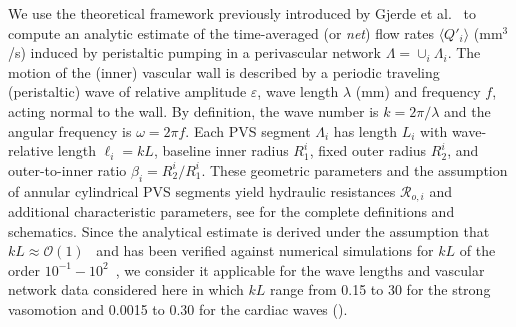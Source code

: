 We use the theoretical framework previously introduced by Gjerde et al.~\cite{gjerde2023directional} to compute an analytic estimate of the time-averaged (or \emph{net}) flow rates $\langle Q'_i \rangle$ (mm$^3$/s) induced by peristaltic pumping in a perivascular network $\Lambda = \cup_i \Lambda_i$. The motion of the (inner) vascular wall is described by a periodic traveling (peristaltic) wave of relative amplitude $\varepsilon$, wave length $\lambda$ (mm) and frequency $f$, acting normal to the wall. By definition, the wave number is $k = 2 \pi/\lambda$ and the angular frequency is $\omega = 2 \pi f$. Each PVS segment $\Lambda_i$ has length $L_i$ with wave-relative length $\ell_i = k L$, baseline inner radius $R_1^i$, fixed outer radius $R_2^i$, and outer-to-inner ratio $\beta_i = R_2^i/R_1^i$. These geometric parameters and the assumption of annular cylindrical PVS segments yield hydraulic resistances $\mathcal{R}_{o, i}$ and additional characteristic parameters, see \cite{gjerde2023directional} for the complete definitions and schematics. Since the analytical estimate is derived under the assumption that $k L \approx \mathcal{O} (1)$~\cite{gjerde2023directional} and has been verified against numerical simulations for $k L$ of the order $10^{-1}-10^2$~\cite[Table I]{gjerde2023directional}, we consider it applicable for the wave lengths and vascular network data considered here in which $k L$ range from 0.15 to 30 for the strong vasomotion and 0.0015 to 0.30 for the cardiac waves ().
